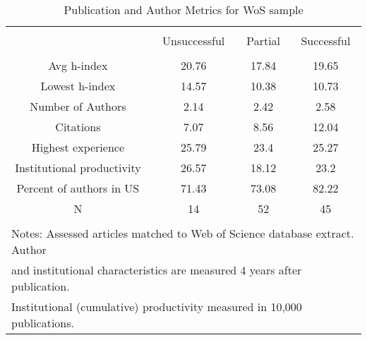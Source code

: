 
\begin{table}[!htbp] \centering 
  \caption{Publication and Author Metrics for WoS sample} 
  \label{tab:metrics:OA:WoS} 
\begin{tabular}{@{\extracolsep{0.4pt}} cccc} 
\\[-1.8ex]\hline 
\hline \\[-1.8ex] 
  & Unsuccessful & Partial & Successful \\ 
\hline \\[-1.8ex] 
Avg h-index & 20.76 & 17.84 & 19.65 \\ 
Lowest h-index & 14.57 & 10.38 & 10.73 \\ 
Number of Authors & 2.14 & 2.42 & 2.58 \\ 
Citations & 7.07 & 8.56 & 12.04 \\ 
Highest experience & 25.79 & 23.4 & 25.27 \\ 
Institutional productivity & 26.57 & 18.12 & 23.2 \\ 
Percent of authors in US & 71.43 & 73.08 & 82.22 \\ 
N & 14 & 52 & 45 \\ 
\hline \\[-1.8ex] 
\multicolumn{4}{l}{Notes: Assessed articles matched to Web of Science database extract. Author } \\ 
\multicolumn{4}{l}{and institutional characteristics are measured 4 years after publication.} \\ 
\multicolumn{4}{l}{Institutional (cumulative) productivity measured in 10,000 publications.} \\ 
\end{tabular} 
\end{table} 
